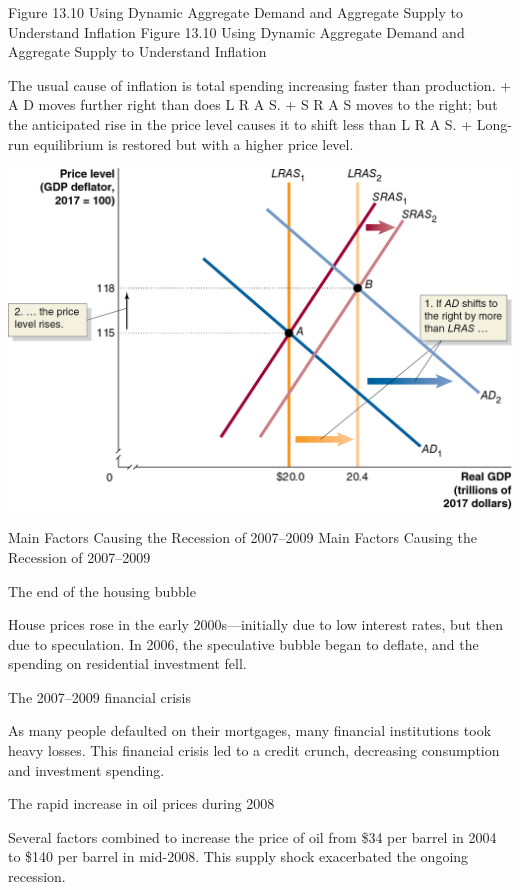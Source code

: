 \documentclass[
  12pt,
  ignorenonframetext,
]{beamer}
\begin{document}
\begin{frame}{Figure 13.10 Using Dynamic Aggregate Demand and Aggregate
Supply to Understand Inflation}
\protect\hypertarget{figure-13.10-using-dynamic-aggregate-demand-and-aggregate-supply-to-understand-inflation}{}
Figure 13.10 Using Dynamic Aggregate Demand and Aggregate Supply to
Understand Inflation

The usual cause of inflation is total spending increasing faster than
production. + A D moves further right than does L R A S. + S R A S moves
to the right; but the anticipated rise in the price level causes it to
shift less than L R A S. + Long-run equilibrium is restored but with a
higher price level.

\includegraphics[width=\textwidth,height=0.99\textheight]{imgs3/img_slide46a.png}
\end{frame}

\begin{frame}{Main Factors Causing the Recession of 2007--2009}
\protect\hypertarget{main-factors-causing-the-recession-of-20072009}{}
Main Factors Causing the Recession of 2007--2009

The end of the housing bubble

House prices rose in the early 2000s---initially due to low interest
rates, but then due to speculation. In 2006, the speculative bubble
began to deflate, and the spending on residential investment fell.

The 2007--2009 financial crisis

As many people defaulted on their mortgages, many financial institutions
took heavy losses. This financial crisis led to a credit crunch,
decreasing consumption and investment spending.

The rapid increase in oil prices during 2008

Several factors combined to increase the price of oil from \$34 per
barrel in 2004 to \$140 per barrel in mid-2008. This supply shock
exacerbated the ongoing recession.
\end{frame}
\end{document}
